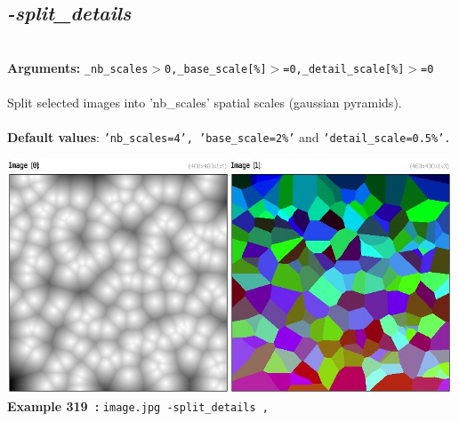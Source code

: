 \documentclass[a4paper,11pt,twoside]{book}
\begin{document}
\subsection{\emph{-split\_details} }\vspace*{-0.5em}
~\\\textbf{Arguments: } 
{\small \texttt{\_nb\_scales$>$0,\_base\_scale[\%]$>$=0,\_detail\_scale[\%]$>$=0}}\\~\\
Split selected images into 'nb\_scales' spatial scales (gaussian pyramids).
~\\~\\\textbf{Default values}: {\small \texttt{'nb\_scales=4', 'base\_scale=2\%'} and \texttt{'detail\_scale=0.5\%'.}}
\begin{center}\includegraphics[keepaspectratio=true,height=7cm,width=\textwidth]{img/gmic_def319.jpg}\\
{\footnotesize \textbf{Example 319~:} \texttt{image.jpg -split\_details ,}}
\end{center}
\end{document}
